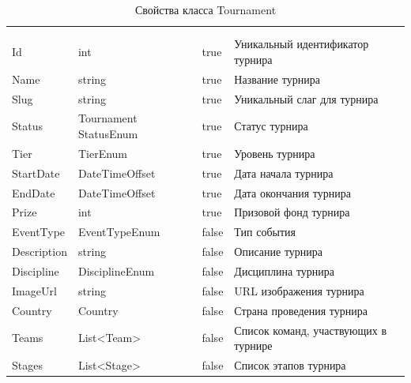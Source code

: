 \begin{xltabular}{\textwidth}{|X|X|X|X|}
	\caption{Свойства класса Tournament}\label{table:Tournament}\\ \hline
	 &  &  &  \\ \hline
	 &  &  &  \\ \hline
	\endfirsthead
	 \hline
	 &  &  &  \\ \hline
	\endhead
	Id & int & true & Уникальный идентификатор турнира \\ \hline
	Name & string & true & Название турнира \\ \hline
	Slug & string & true & Уникальный слаг для турнира \\ \hline
	Status & Tournament
	StatusEnum & true & Статус турнира \\ \hline
	Tier & TierEnum & true & Уровень турнира \\ \hline
	StartDate & DateTimeOffset & true & Дата начала турнира \\ \hline
	EndDate & DateTimeOffset & true & Дата окончания турнира \\ \hline
	Prize & int & true & Призовой фонд турнира \\ \hline
	EventType & EventTypeEnum & false & Тип события \\ \hline
	Description & string & false & Описание турнира \\ \hline
	Discipline & DisciplineEnum & false & Дисциплина турнира \\ \hline
	ImageUrl & string & false & URL изображения турнира \\ \hline
	Country & Country & false & Страна проведения турнира \\ \hline
	Teams & List<Team> & false & Список команд, участвующих в турнире \\ \hline
	Stages & List<Stage> & false & Список этапов турнира \\ \hline
\end{xltabular}

